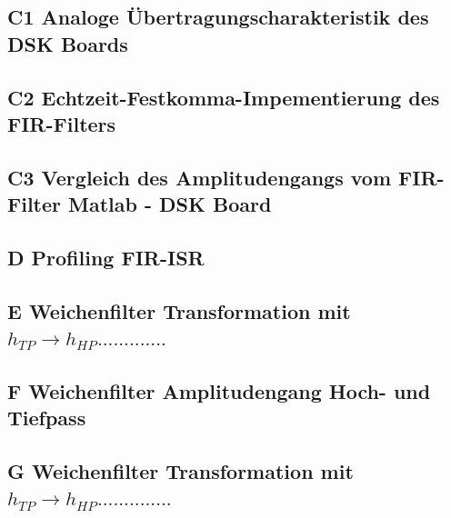 \newpage
\subsection{C1 Analoge Übertragungscharakteristik des DSK Boards}

\subsection{C2 Echtzeit-Festkomma-Impementierung des FIR-Filters}


\subsection{C3 Vergleich des Amplitudengangs vom FIR-Filter Matlab - DSK Board}

\subsection{D Profiling FIR-ISR}

\subsection{E Weichenfilter Transformation mit $h_{TP} \rightarrow h_{HP} .............$}

\subsection{F Weichenfilter Amplitudengang Hoch- und Tiefpass}

\subsection{G Weichenfilter Transformation mit $h_{TP} \rightarrow h_{HP} ..............$}
 
